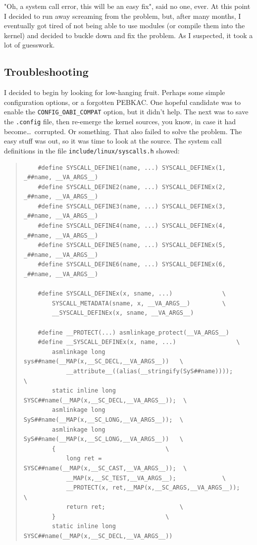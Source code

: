 \documentclass{article}
\begin{document}
"Oh, a system call error, this will be an easy fix", said no one, ever.  At this point I decided to run away screaming from the problem, but, after many months, I eventually got tired of not being able to use modules (or compile them into the kernel) and decided to buckle down and fix the problem.  As I suspected, it took a lot of guesswork.

\subsection{Troubleshooting}

I decided to begin by looking for low-hanging fruit.  Perhaps some simple configuration options, or a forgotten PEBKAC.  One hopeful candidate was to enable the \texttt{CONFIG_OABI_COMPAT} option, but it didn't help.  The next was to save the \texttt{.config} file, then re-emerge the kernel sources, you know, in case it had become\ldots~corrupted.  Or something.  That also failed to solve the problem.  The easy stuff was out, so it was time to look at the source.  The system call definitions in the file \texttt{include/linux/syscalls.h} showed:

\begin{quote}
\begin{verbatim}
	#define SYSCALL_DEFINE1(name, ...) SYSCALL_DEFINEx(1, _##name, __VA_ARGS__)
	#define SYSCALL_DEFINE2(name, ...) SYSCALL_DEFINEx(2, _##name, __VA_ARGS__)
	#define SYSCALL_DEFINE3(name, ...) SYSCALL_DEFINEx(3, _##name, __VA_ARGS__)
	#define SYSCALL_DEFINE4(name, ...) SYSCALL_DEFINEx(4, _##name, __VA_ARGS__)
	#define SYSCALL_DEFINE5(name, ...) SYSCALL_DEFINEx(5, _##name, __VA_ARGS__)
	#define SYSCALL_DEFINE6(name, ...) SYSCALL_DEFINEx(6, _##name, __VA_ARGS__)

	#define SYSCALL_DEFINEx(x, sname, ...)				\
		SYSCALL_METADATA(sname, x, __VA_ARGS__)			\
		__SYSCALL_DEFINEx(x, sname, __VA_ARGS__)

	#define __PROTECT(...) asmlinkage_protect(__VA_ARGS__)
	#define __SYSCALL_DEFINEx(x, name, ...)					\
		asmlinkage long sys##name(__MAP(x,__SC_DECL,__VA_ARGS__))	\
			__attribute__((alias(__stringify(SyS##name))));		\
		static inline long SYSC##name(__MAP(x,__SC_DECL,__VA_ARGS__));	\
		asmlinkage long SyS##name(__MAP(x,__SC_LONG,__VA_ARGS__));	\
		asmlinkage long SyS##name(__MAP(x,__SC_LONG,__VA_ARGS__))	\
		{								\
			long ret = SYSC##name(__MAP(x,__SC_CAST,__VA_ARGS__));	\
			__MAP(x,__SC_TEST,__VA_ARGS__);				\
			__PROTECT(x, ret,__MAP(x,__SC_ARGS,__VA_ARGS__));	\
			return ret;						\
		}								\
		static inline long SYSC##name(__MAP(x,__SC_DECL,__VA_ARGS__))
\end{verbatim}
\end{quote}
\end{document}
